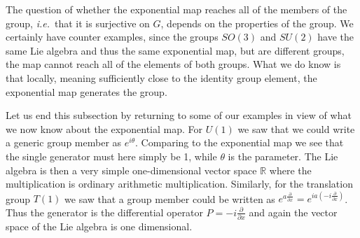 \documentclass[notes.tex]{subfiles}
\begin{document}
The question of whether the exponential map reaches all of the members of the group, {\it i.e.}\ that it is surjective on $G$, depends on the properties of the group. We certainly have counter examples, since the groups $SO(3)$ and $SU(2)$ have the same Lie algebra and thus the same exponential map, but are different groups, the map cannot reach all of the elements of both groups. What we do know is that locally, meaning sufficiently close to the identity group element, the exponential map generates the group.

Let us end this subsection by returning to some of our examples in view of what we now know about the exponential map. For $U(1)$ we saw that we could write a generic group member as $e^{i\theta}$. Comparing to the exponential map we see that the single generator must here simply be 1, while $\theta$ is the parameter. The Lie algebra is then a very simple one-dimensional vector space $\mathbb R$ where the multiplication is ordinary arithmetic multiplication. Similarly, for the translation group $T(1)$ we saw that a group member could be written as $e^{a\frac{\partial}{\partial x}}=e^{ia(-i\frac{\partial}{\partial x})}$. Thus the generator is the differential operator $P=-i\frac{\partial}{\partial x}$ and again the vector space of the Lie algebra is one dimensional.
\end{document}
